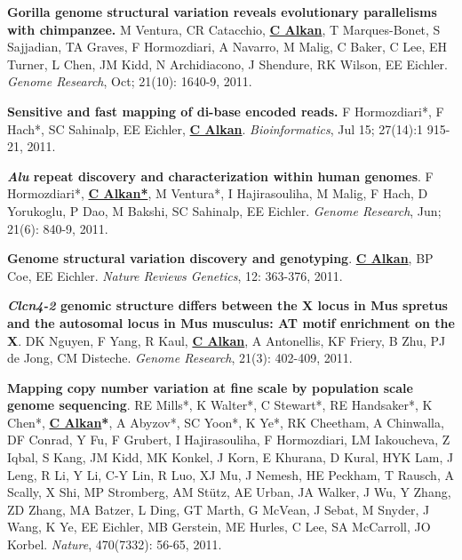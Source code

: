 \vspace{-.2cm}
{\bf Gorilla genome structural variation reveals evolutionary parallelisms with chimpanzee.}
M Ventura, CR Catacchio, {\bf {\underline {C Alkan}}}, T Marques-Bonet, S Sajjadian, TA Graves, F Hormozdiari, A Navarro, 
M Malig, C Baker, C Lee, EH Turner, L Chen, JM Kidd, N Archidiacono, J Shendure, RK Wilson, EE Eichler.
{\em Genome Research}, Oct; 21(10): 1640-9, 2011.


\vspace{-.2cm}
{\bf Sensitive and fast mapping of di-base encoded reads.}
F Hormozdiari*, F Hach*, SC Sahinalp, EE Eichler, {\bf {\underline {C Alkan}}}.
{\em Bioinformatics}, Jul 15; 27(14):1 915-21, 2011.



\vspace{-.2cm}
{\bf \textit {Alu} repeat discovery and characterization within human genomes}.
F Hormozdiari*, {\bf {\underline {C Alkan*}}}, M Ventura*, I Hajirasouliha, M Malig, 
F Hach, D Yorukoglu, P Dao, M Bakshi, SC Sahinalp, EE Eichler.
{\em Genome Research}, Jun; 21(6): 840-9, 2011.

\vspace{-.2cm}
{\bf Genome structural variation discovery and genotyping}. 
{\bf {\underline {C Alkan}}}, BP Coe, EE Eichler.
{\em Nature Reviews Genetics}, 12: 363-376, 2011.


\vspace{-.2cm}
{\bf {\em Clcn4-2} genomic structure differs between the X locus in Mus spretus and the autosomal 
locus in Mus musculus: AT motif enrichment on the X}.  
DK Nguyen, F Yang, R Kaul, {\bf {\underline {C Alkan}}}, A Antonellis, KF Friery, 
B Zhu, PJ de Jong, CM Disteche. 
{\em Genome Research}, 21(3): 402-409, 2011.

\vspace{-.2cm}
{\bf Mapping copy number variation at fine scale by population scale genome sequencing}.
RE Mills*, K Walter*, C Stewart*, RE Handsaker*, K Chen*, 
{\bf {\underline {C Alkan}*}}, A Abyzov*, SC Yoon*, K Ye*, RK Cheetham, 
A Chinwalla, DF Conrad, Y Fu, F Grubert, I Hajirasouliha, 
F Hormozdiari, LM Iakoucheva, Z Iqbal, S Kang, JM Kidd, 
MK Konkel, J Korn, E Khurana, D Kural, HYK Lam, J Leng, 
R Li, Y Li, C-Y Lin, R Luo, XJ Mu, J Nemesh,
HE Peckham, T Rausch, A Scally, X Shi, MP Stromberg, 
AM St\"{u}tz, AE Urban, JA Walker, J Wu, Y Zhang, 
ZD Zhang, MA Batzer, L Ding, GT Marth, G McVean, 
J Sebat, M Snyder, J Wang, K Ye, EE Eichler, 
MB Gerstein, ME Hurles, C Lee, SA McCarroll,  JO Korbel.
{\em Nature}, 470(7332): 56-65, 2011.

